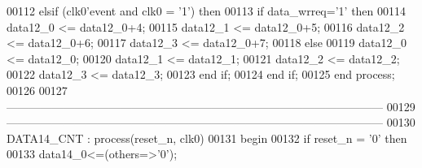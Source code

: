 \begin{DoxyCode}
00112       \textcolor{keywordflow}{elsif} \textcolor{vhdlchar}{(}\textcolor{vhdlchar}{clk0}\textcolor{vhdlchar}{'}\textcolor{vhdlkeyword}{event} \textcolor{keywordflow}{and} \textcolor{vhdlchar}{clk0} \textcolor{vhdlchar}{=} \textcolor{vhdlchar}{'}\textcolor{vhdllogic}{}\textcolor{vhdllogic}{1}\textcolor{vhdlchar}{'}\textcolor{vhdlchar}{)} \textcolor{keywordflow}{then}
00113          \textcolor{keywordflow}{if} \textcolor{vhdlchar}{data_wrreq}\textcolor{vhdlchar}{=}\textcolor{vhdlchar}{'}\textcolor{vhdllogic}{}\textcolor{vhdllogic}{1}\textcolor{vhdlchar}{'} \textcolor{keywordflow}{then}   
00114             \textcolor{vhdlchar}{data12_0} \textcolor{vhdlchar}{<=} \textcolor{vhdlchar}{data12_0}\textcolor{vhdlchar}{+}\textcolor{vhdllogic}{}\textcolor{vhdllogic}{4};
00115             \textcolor{vhdlchar}{data12_1} \textcolor{vhdlchar}{<=} \textcolor{vhdlchar}{data12_0}\textcolor{vhdlchar}{+}\textcolor{vhdllogic}{}\textcolor{vhdllogic}{5};
00116             \textcolor{vhdlchar}{data12_2} \textcolor{vhdlchar}{<=} \textcolor{vhdlchar}{data12_0}\textcolor{vhdlchar}{+}\textcolor{vhdllogic}{}\textcolor{vhdllogic}{6};
00117             \textcolor{vhdlchar}{data12_3} \textcolor{vhdlchar}{<=} \textcolor{vhdlchar}{data12_0}\textcolor{vhdlchar}{+}\textcolor{vhdllogic}{}\textcolor{vhdllogic}{7}; 
00118          \textcolor{keywordflow}{else} 
00119             \textcolor{vhdlchar}{data12_0} \textcolor{vhdlchar}{<=} \textcolor{vhdlchar}{data12_0};
00120             \textcolor{vhdlchar}{data12_1} \textcolor{vhdlchar}{<=} \textcolor{vhdlchar}{data12_1};
00121             \textcolor{vhdlchar}{data12_2} \textcolor{vhdlchar}{<=} \textcolor{vhdlchar}{data12_2};
00122             \textcolor{vhdlchar}{data12_3} \textcolor{vhdlchar}{<=} \textcolor{vhdlchar}{data12_3}; 
00123          \textcolor{keywordflow}{end} \textcolor{keywordflow}{if};
00124       \textcolor{keywordflow}{end} \textcolor{keywordflow}{if};
00125    \textcolor{keywordflow}{end} \textcolor{keywordflow}{process};
00126    
00127 \textcolor{keyword}{   ---------------------------------------------------------------------------------------------------}
00129 \textcolor{keyword}{   ---------------------------------------------------------------------------------------------------}
00130    DATA14\_CNT : \textcolor{keywordflow}{process}(reset_n, clk0)
00131 \textcolor{vhdlkeyword}{   begin}
00132       \textcolor{keywordflow}{if} \textcolor{vhdlchar}{reset_n} \textcolor{vhdlchar}{=} \textcolor{vhdlchar}{'}\textcolor{vhdllogic}{}\textcolor{vhdllogic}{0}\textcolor{vhdlchar}{'} \textcolor{keywordflow}{then} 
00133          \textcolor{vhdlchar}{data14_0}\textcolor{vhdlchar}{<=}\textcolor{vhdlchar}{(}\textcolor{keywordflow}{others}\textcolor{vhdlchar}{=}\textcolor{vhdlchar}{>}\textcolor{vhdlchar}{'}\textcolor{vhdllogic}{}\textcolor{vhdllogic}{0}\textcolor{vhdlchar}{'}\textcolor{vhdlchar}{)};

\end{DoxyCode}
